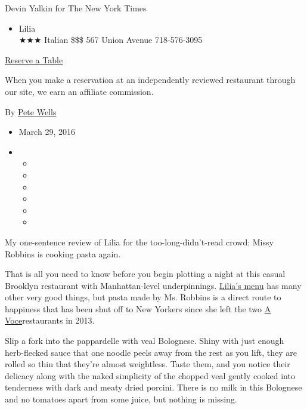 Devin Yalkin for The New York Times

\begin{itemize}
\tightlist
\item
  Lilia\\
  ★★★ Italian \$\$\$ 567 Union Avenue 718-576-3095
\end{itemize}

\href{https://resy.com/cities/ny/lilia?utm_source=nyt\&utm_medium=restoprofile\&utm_campaign=affiliates\&aff_id=c1fe784}{Reserve
a Table}

When you make a reservation at an independently reviewed restaurant
through our site, we earn an affiliate commission.

By \href{http://www.nytimes3xbfgragh.onion/by/pete-wells}{Pete Wells}

\begin{itemize}
\item
  March 29, 2016
\item
  \begin{itemize}
  \item
  \item
  \item
  \item
  \item
  \item
  \end{itemize}
\end{itemize}

My one-sentence review of Lilia for the too-long-didn't-read crowd:
Missy Robbins is cooking pasta again.

That is all you need to know before you begin plotting a night at this
casual Brooklyn restaurant with Manhattan-level underpinnings.
\href{http://www.lilianewyork.com/menu/}{Lilia's menu} has many other
very good things, but pasta made by Ms. Robbins is a direct route to
happiness that has been shut off to New Yorkers since she left the two
\href{http://www.nytimes3xbfgragh.onion/2009/11/25/dining/reviews/25rest.html?pagewanted=all}{A
Voce}restaurants in 2013.

Slip a fork into the pappardelle with veal Bolognese. Shiny with just
enough herb-flecked sauce that one noodle peels away from the rest as
you lift, they are rolled so thin that they're almost weightless. Taste
them, and you notice their delicacy along with the naked simplicity of
the chopped veal gently cooked into tenderness with dark and meaty dried
porcini. There is no milk in this Bolognese and no tomatoes apart from
some juice, but nothing is missing.

